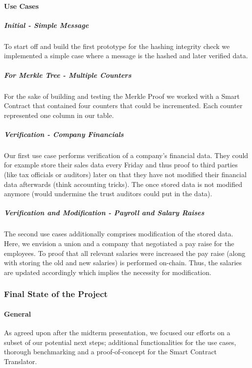 \paragraph{Use Cases}
\subparagraph{Initial - Simple Message}
To start off and build the first prototype for the hashing integrity check we implemented a simple case where a message is the hashed and later verified data.

\subparagraph{For Merkle Tree - Multiple Counters}
For the sake of building and testing the Merkle Proof we worked with a Smart Contract that contained four counters that could be incremented. Each counter represented one column in our table.

\subparagraph{Verification - Company Financials}
Our first use case performs verification of a company’s financial data. They could for example store their sales data every Friday and thus proof to third parties (like tax officials or auditors) later on that they have not modified their financial data afterwards (think accounting tricks). The once stored data is not modified anymore (would undermine the trust auditors could put in the data).

\subparagraph{Verification and Modification - Payroll and Salary Raises}
The second use cases additionally comprises modification of the stored data. Here, we envision a union and a company that negotiated a pay raise for the employees. To proof that all relevant salaries were increased the pay raise (along with storing the old and new salaries) is performed on-chain. Thus, the salaries are updated accordingly which implies the necessity for modification.

\subsubsection{Final State of the Project}
\paragraph{General}
As agreed upon after the midterm presentation, we focused our efforts on a subset of our potential next steps; additional functionalities for the use cases, thorough benchmarking and a proof-of-concept for the Smart Contract Translator.

